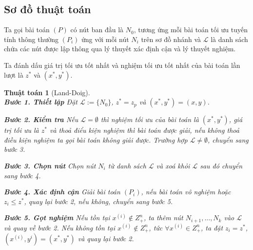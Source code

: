 \documentclass[12pt,a4paper]{report}
\newtheorem{ttoan}{Thuật toán}
\begin{document}
\subsection*{Sơ đồ thuật toán}
Ta gọi bài toán $(P)$ có nút ban đầu là $N_0$, tương ứng mỗi bài toán tối ưu tuyến tính thông thường $(P_i)$ ứng với mỗi nút $N_i$ trên sơ đồ nhánh và $\mathcal{L}$ là danh sách chứa các nút được lập thông qua lý thuyết xác định cận và lý thuyết nghiệm.

Ta đánh dấu giá trị tối ưu tốt nhất và nghiệm tối ưu tốt nhất của bài toán lần lượt là $z^*$ và $(x^*,y^*)$.

\begin{ttoan}[Land-Doig]
\setlength{\parindent}{4em}
\noindent \\
\noindent \textbf{Bước 1. Thiết lập}
Đặt $\mathcal{L}:=\{N_0 \}$, $z^*=z_p$ và $(x^*,y^*)=(x,y)$. 

\noindent \textbf{Bước 2. Kiểm tra} 
Nếu $\mathcal{L} = \emptyset$ thì nghiệm tối ưu của bài toán là $(x^*,y^*)$, giá trị  tối ưu là $z^*$ và thoả điểu kiện nghiệm thì bài toán được giải, nếu không thoả điều kiện nghiệm ta gọi bài toán không giải được. 
Trường hợp $\mathcal{L} \neq \emptyset$, chuyển sang bước 3.

\noindent \textbf{Bước 3. Chọn nút} 
Chọn nút $N_i$ từ danh sách $\mathcal{L}$ và xoá khỏi $\mathcal{L}$ sau đó chuyển sang  bước 4. 

\noindent \textbf{Bước 4. Xác định cận}  
Giải bài toán $(P_i)$, nếu bài toán vô nghiệm hoặc $z_i \leq z^*$, quay  lại bước 2, nếu không, chuyển sang bước 5.

\noindent \textbf{Bước 5. Gọt nghiệm} 
Nếu tồn tại $x^{(i)} \notin Z^n_+$, ta thêm nút $N_{i+1}, \ldots , N_{k}$ vào $\mathcal{L}$ và quay  về bước 2. 
Nếu không tồn tại $x^{(i)} \notin Z^n_+$, tức $\forall x^{(i)} \in Z^n_+$, ta đặt $z_i = z^*$,  $(x^{(i)},y^i) = (x^*,y^*)$ và quay lại bước 2.
\end{ttoan}
\end{document}
